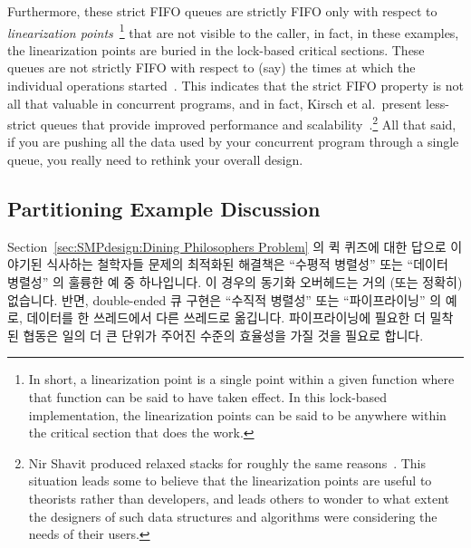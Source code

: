 Furthermore, these strict FIFO queues are strictly FIFO only with
respect to
\emph{linearization points}~\cite{Herlihy:1990:LCC:78969.78972}\footnote{
	In short, a linearization point is a single point within a given
	function where that function can be said to have taken effect.
	In this lock-based implementation, the linearization points
	can be said to be anywhere within the critical section that
	does the work.}
that are not visible to the caller, in fact, in these examples,
the linearization points are buried in the lock-based critical
sections.
These queues are not strictly FIFO with respect to (say) the times at which
the individual operations started~\cite{AndreasHaas2012FIFOisnt}.
This indicates that the strict FIFO property is not all that valuable
in concurrent programs, and in fact, Kirsch et al.~present less-strict
queues that provide improved performance and
scalability~\cite{ChristophMKirsch2012FIFOisntTR}.\footnote{
	Nir Shavit produced relaxed stacks for roughly the same
	reasons~\cite{Shavit:2011:DSM:1897852.1897873}.
	This situation leads some to believe that the linearization
	points are useful to theorists rather than developers, and
	leads others to wonder to what extent the designers of such
	data structures and algorithms were considering the needs
	of their users.}
All that said, if you are pushing all the data used by your concurrent
program through a single queue, you really need to rethink your
overall design.
\fi

\subsection{Partitioning Example Discussion}
\label{sec:SMPdesign:Partitioning Example Discussion}

Section~\ref{sec:SMPdesign:Dining Philosophers Problem} 의 퀵 퀴즈에 대한
답으로 이야기된 식사하는 철학자들 문제의 최적화된 해결책은 ``수평적 병렬성''
또는 ``데이터 병렬성'' 의 훌륭한 예 중 하나입니다.
이 경우의 동기화 오버헤드는 거의 (또는 정확히) 없습니다.
반면, double-ended 큐 구현은 ``수직적 병렬성'' 또는 ``파이프라이닝'' 의 예로,
데이터를 한 쓰레드에서 다른 쓰레드로 옮깁니다.
파이프라이닝에 필요한 더 밀착된 협동은 일의 더 큰 단위가 주어진 수준의 효율성을
가질 것을 필요로 합니다.

